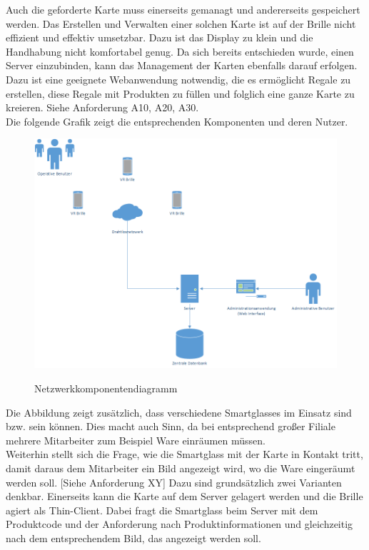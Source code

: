 Auch die geforderte Karte muss einerseits gemanagt und andererseits gespeichert werden. 
Das Erstellen und Verwalten einer solchen Karte ist auf der Brille nicht effizient und effektiv umsetzbar. Dazu ist das Display zu klein und die Handhabung nicht komfortabel genug. Da sich bereits entschieden wurde, einen Server einzubinden, kann das Management der Karten ebenfalls darauf erfolgen. Dazu ist eine geeignete Webanwendung notwendig, die es ermöglicht Regale zu erstellen, diese Regale mit Produkten zu füllen und folglich eine ganze Karte zu kreieren. Siehe Anforderung A10, A20, A30.
\\
Die folgende Grafik zeigt die entsprechenden Komponenten und deren Nutzer.
\begin{figure}[H]
	\centering
	{\includegraphics[scale=0.5]{Bilder/komponentendarstellung.png}}
	\caption{Netzwerkkomponentendiagramm}
	\label{fig:komponentendarstellung}
\end{figure}
Die Abbildung zeigt zusätzlich, dass verschiedene Smartglasses im Einsatz sind bzw. sein können. Dies macht auch Sinn, da bei entsprechend großer Filiale mehrere Mitarbeiter zum Beispiel Ware einräumen müssen. 
\\
Weiterhin stellt sich die Frage, wie die Smartglass mit der Karte in Kontakt tritt, damit daraus dem Mitarbeiter ein Bild angezeigt wird, wo die Ware eingeräumt werden soll. [Siehe Anforderung XY]
Dazu sind grundsätzlich zwei Varianten denkbar. Einerseits kann die Karte auf dem Server gelagert werden und die Brille agiert als Thin-Client. Dabei fragt die Smartglass beim Server mit dem Produktcode und der Anforderung nach Produktinformationen und gleichzeitig nach dem entsprechendem Bild, das angezeigt werden soll. 
